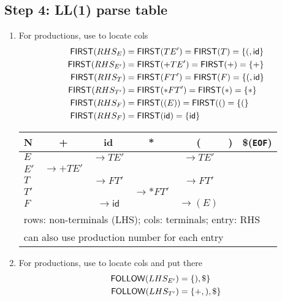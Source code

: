 \documentclass[10pt,a4paper,landscape]{article}
\begin{document}
\begin{multicols*}{3}
\section*{Step 4: LL(1) parse table}
\begin{enumerate}
\item For  productions, use  to locate cols
  \begin{align*}
    \mfn{first}(RHS_{E}) &=\mfn{first}(TE')=\mfn{first}(T) = \mset{(,\mathsf{id}} \\
    \mfn{first}(RHS_{E'})&=\mfn{first}(+TE')=\mfn{first}(+) = \mset{+} \\
    \mfn{first}(RHS_{T}) &=\mfn{first}(FT')=\mfn{first}(F) = \mset{(,\mathsf{id}} \\
    \mfn{first}(RHS_{T'})&=\mfn{first}(*FT')=\mfn{first}(*) = \mset{*} \\
    \mfn{first}(RHS_{F}) &=\mfn{first}((E))= \mfn{first}(() = \mset{(} \\
    \mfn{first}(RHS_{F}) &=\mfn{first}(\mathsf{id}) = \mset{\mathsf{id}}
  \end{align*}
  \begin{tabular}{l|c|c|c|c|c|c}
  \hline
  N       & +          & id  & *          & (           & )   & \$(\texttt{EOF})\\
  \hline
  \(E\)   &            &\(\to TE'\)&& \(\to TE'\) &     & \\
  \(E'\)  &\(\to +TE'\)& &&&\\
  \(T\)   &            &\(\to FT'\)    &            &\(\to FT'\) &\\
  \(T'\)  &            &      &\(\to *FT'\)&&\\
  \(F\)   &            &\(\to \mathsf{id}\)& &\(\to (E)\)&&\\
  \hline
  \multicolumn{7}{l}{rows: non-terminals (LHS); cols: terminals; entry: RHS}\\
  \hline
  \multicolumn{7}{l}{can also use production number for each entry}\\
  \hline
  \end{tabular}
\vspace{.1em}
\item For \mb{$\boldsymbol{\varepsilon}$} productions, use  to locate cols and put \mb{$\boldsymbol{\varepsilon}$} there
  \begin{align*}
    \mfn{follow}(LHS_{E'})&= \mset{), \$}\\
    \mfn{follow}(LHS_{T'})&= \mset{+, ), \$}
  \end{align*}

\end{enumerate}
\end{multicols*}
\end{document}
